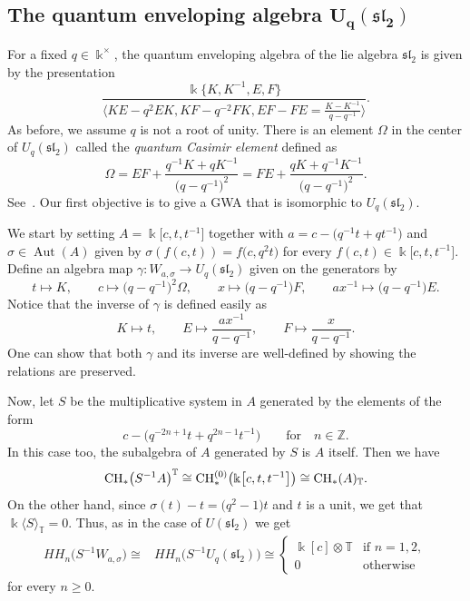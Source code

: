 \documentclass[10pt,a4paper]{amsart}
\newcommand{\G}[1]{\mathfrak{#1}}
\newcommand{\B}[1]{\mathbb{#1}}
\newcommand{\CH}{{\rm CH}}
\renewcommand{\geq}{\geqslant}
\numberwithin{equation}{section}
\begin{document}
\subsection[The quantum enveloping algebra U\_q(Gsl\_2)]{The quantum enveloping algebra $\boldsymbol{U_q(\G{sl}_2)}$}\label{sect:QuantumSL2}

For a fixed $q\in\Bbbk^\times$, the quantum enveloping algebra of the lie algebra $\G{sl}_2$
is given by the presentation
\[ \frac{\Bbbk\big\{K,K^{-1},E,F\big\}}{\big\langle KE - q^2EK, KF - q^{-2}FK,
 EF-FE=\frac{K-K^{-1}}{q-q^{-1}}\big\rangle}.
\] As before, we assume $q$ is not a root of unity. There is an element $\Omega$ in the
center of $U_q(\G{sl}_2)$ called the \emph{quantum Casimir element} defined as
\[%
 \Omega = EF + \frac{q^{-1}K + qK^{-1}}{\bigl(q-q^{-1}\bigr)^2}
 = FE + \frac{qK+q^{-1}K^{-1}}{\bigl(q-q^{-1}\bigr)^2}.
\]
See~\cite[Section~I.3]{BrownGoodearl:QuantumGroups}. Our first objective is to give a GWA that
is isomorphic to $U_q(\G{sl}_2)$.

We start by setting $A=\Bbbk\big[c,t,t^{-1}\big]$ together with
$
 a = c - \bigl(q^{-1}t+qt^{-1}\bigr)
$
and $\sigma\in \operatorname{Aut}(A)$ given by $\sigma(f(c,t)) = f\bigl(c,q^2 t\bigr)$ for every
$f(c,t)\in\Bbbk\big[c,t,t^{-1}\big]$. Define an algebra map
$\gamma\colon W_{a,\sigma}\to U_q(\G{sl}_2)$ given on the generators by
\[
 t\mapsto K, \qquad
 c\mapsto \bigl(q-q^{-1}\bigr)^2\Omega, \qquad
 x\mapsto \bigl(q-q^{-1}\bigr)F,\qquad
 ax^{-1} \mapsto \bigl(q-q^{-1}\bigr)E.
\] Notice that the inverse of $\gamma$ is defined easily as
\[ K\mapsto t, \qquad
 E\mapsto \frac{ax^{-1}}{q-q^{-1}},\qquad
 F\mapsto \frac{x}{q-q^{-1}}.
\] One can show that both $\gamma$ and its inverse are well-defined by showing the
relations are preserved.

Now, let $S$ be the multiplicative system in $A$ generated by the elements of the form
\[
 c - \bigl(q^{-2n+1}t+q^{2n-1}t^{-1}\bigr)\qquad \text{for}\quad n\in\B{Z}.
\]
In this case too, the subalgebra of $A$ generated by $S$ is $A$ itself. Then we have
\[
 \CH_*\bigl(S^{-1}A\bigr)^{\B{T}} \cong \CH_*^{(0)}\bigl(\Bbbk\big[c,t,t^{-1}\big]\bigr) \cong \CH_*(A)_{\B{T}}.
\]
On the other hand, since $\sigma(t)-t = \bigl(q^2-1\bigr)t$ and $t$ is a unit, we get that
$\Bbbk\langle S\rangle_{\B{T}} = 0$. Thus, as in the case of $U(\G{sl}_2)$ we get
\begin{align*}
 HH_n\bigl(S^{-1}W_{a,\sigma}\bigr)
 \cong & HH_n\bigl(S^{-1}U_q(\G{sl}_2)\bigr)
 \cong
 \begin{cases}
 \Bbbk[c]\otimes\B{T} & \text{if } n=1,2,\\
 0 & \text{otherwise }
 \end{cases}
\end{align*}
for every $n\geq 0$.
\end{document}
